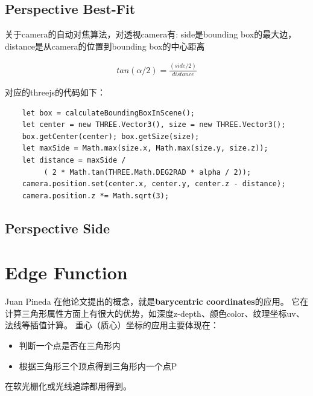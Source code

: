 \subsection{Perspective Best-Fit}
关于camera的自动对焦算法，对透视camera有: side是bounding box的最大边， distance是从camera的位置到bounding box的中心距离

\begin{align*}
    tan(\alpha / 2) = \frac{(side / 2)}{distance}
\end{align*}

对应的threejs的代码如下：

\begin{lstlisting}
    let box = calculateBoundingBoxInScene();
    let center = new THREE.Vector3(), size = new THREE.Vector3();
    box.getCenter(center); box.getSize(size);
    let maxSide = Math.max(size.x, Math.max(size.y, size.z));    
    let distance = maxSide /
         ( 2 * Math.tan(THREE.Math.DEG2RAD * alpha / 2));  
    camera.position.set(center.x, center.y, center.z - distance);
    camera.position.z *= Math.sqrt(3);
\end{lstlisting}

\subsection{Perspective Side}



\section{ Edge Function }
Juan Pineda \cite{EdgeFunction} 在他论文提出的概念，就是\textbf{barycentric coordinates}的应用。
它在计算三角形属性方面上有很大的优势，如深度z-depth、颜色color、纹理坐标uv、法线等插值计算。
重心（质心）坐标的应用主要体现在：
\begin {itemize}
    \item {判断一个点是否在三角形内}
    \item {根据三角形三个顶点得到三角形内一个点P}
\end {itemize}
在软光栅化或光线追踪都用得到。

